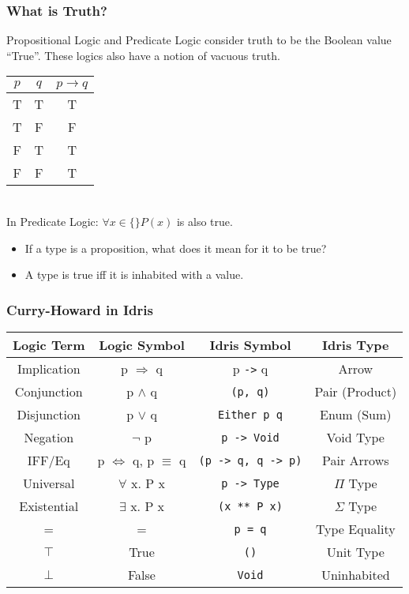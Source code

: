 \documentclass[usenames,dvipsnames]{beamer}
\begin{document}
\begin{frame}[fragile]
  \frametitle{What is Truth?}
    Propositional Logic and Predicate Logic consider truth to be the Boolean
     value ``True''. These logics also have a notion of vacuous truth. \\
    $\;$ \\
    \begin{minipage}{0.32\textwidth}
    \begin{tabular}{| c | c | c |}
    \hline
    $p$ & $q$ & $p \rightarrow q$ \\
    \hline
    T & T & T \\
    T & F & F \\
    F & T & T \\
    F & F & T \\
    \hline
    \end{tabular}
    \end{minipage}
  $\;$\\ \\
  In Predicate Logic: $\forall x \in \{\} P(x)$ is also true.
  \begin{itemize}
   \item If a type is a proposition, what does it mean for it to be true?
   \item A type is true iff it is inhabited with a value.
  \end{itemize}
\end{frame}

\begin{frame}[fragile]
  \frametitle{Curry-Howard in Idris}
    \begin{tabular}{c|c|c|c}
    \textbf{Logic Term} & \textbf{Logic Symbol} & \textbf{Idris Symbol}
      & \textbf{Idris Type} \\
    \hline
      Implication & p $\Rightarrow$ q & p \texttt{->} q
      & Arrow \\
      Conjunction & p $\land$ q & \texttt{(p, q)}
      & Pair (Product) \\
      Disjunction & p $\lor$ q & \texttt{Either p q}
      & Enum (Sum)\\
      Negation & $\lnot$ p & \texttt{p -> Void} &
      Void Type \\
      IFF/Eq & p $\Leftrightarrow$ q, p $\equiv$ q & \texttt{(p -> q, q -> p)}
      & Pair Arrows \\
      Universal & $\forall$ x. P x &
      \texttt{p -> Type} & $\Pi$ Type \\
      Existential & $\exists$ x. P x
      & \texttt{(x ** P x)} & $\Sigma$ Type \\
      \hline
            = & = & \texttt{p = q} & Type Equality \\
            $\top$ & True & \texttt{()} & Unit Type \\
            $\bot$ & False & \texttt{Void} & Uninhabited
    \end{tabular}
\end{frame}
\end{document}
